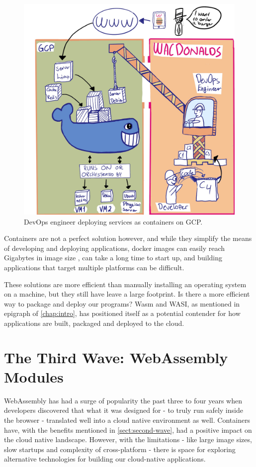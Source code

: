 \documentclass[
  table]{report}
\begin{document}
\begin{figure}[H]
\centering
  \includegraphics[width=0.8\columnwidth]{assets/docker-wave.jpg}
  \caption{DevOps engineer deploying services as containers on \ac{GCP}.}
  \label{fig:docker}
\end{figure}

Containers are not a perfect solution however, and while they simplify
the means of developing and deploying applications, docker images can
easily reach Gigabytes in image size \citep{durieux2023}, can take a
long time to start up, and building applications that target multiple
platforms can be difficult.

These solutions are more efficient than manually installing an operating
system on a machine, but they still have leave a large footprint. Is
there a more efficient way to package and deploy our programs? \ac{Wasm}
and \ac{WASI}, as mentioned in epigraph of \cref{chap:intro}, has
positioned itself as a potential contender for how applications are
built, packaged and deployed to the cloud.

\section{The Third Wave: WebAssembly Modules}
\label{sect:third-wave}

WebAssembly has had a surge of popularity the past three to four years
when developers discovered that what it was designed for - to truly run
safely inside the browser - translated well into a cloud native
environment as well. Containers have, with the benefits mentioned in
\cref{sect:second-wave}, had a positive impact on the cloud native
landscape. However, with the limitations - like large image sizes, slow
startups and complexity of cross-platform - there is space for exploring
alternative technologies for building our cloud-native applications.
\end{document}
